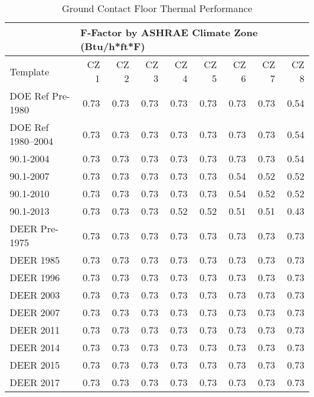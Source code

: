 \begin{table}
\small
\centering
\caption[Ground Contact Floor Thermal Performance]{Ground Contact Floor Thermal Performance}
\label{tab:floor_f_factors}
\begin{tabular}{lrrrrrrrr}
\hline
                  & \multicolumn{8}{l}{F-Factor by ASHRAE Climate Zone (Btu/h*ft*F)} \\ \hline
Template          & CZ 1 & CZ 2 & CZ 3 & CZ 4 & CZ 5 & CZ 6 & CZ 7 & CZ 8 \\ \hline
DOE Ref Pre-1980  & 0.73 & 0.73 & 0.73 & 0.73 & 0.73 & 0.73 & 0.73 & 0.54 \\
DOE Ref 1980--2004 & 0.73 & 0.73 & 0.73 & 0.73 & 0.73 & 0.73 & 0.73 & 0.54 \\
90.1-2004         & 0.73 & 0.73 & 0.73 & 0.73 & 0.73 & 0.73 & 0.73 & 0.54 \\
90.1-2007         & 0.73 & 0.73 & 0.73 & 0.73 & 0.73 & 0.54 & 0.52 & 0.52 \\
90.1-2010         & 0.73 & 0.73 & 0.73 & 0.73 & 0.73 & 0.54 & 0.52 & 0.52 \\
90.1-2013         & 0.73 & 0.73 & 0.73 & 0.52 & 0.52 & 0.51 & 0.51 & 0.43 \\
DEER Pre-1975     & 0.73 & 0.73 & 0.73 & 0.73 & 0.73 & 0.73 & 0.73 & 0.73 \\
DEER 1985         & 0.73 & 0.73 & 0.73 & 0.73 & 0.73 & 0.73 & 0.73 & 0.73 \\
DEER 1996         & 0.73 & 0.73 & 0.73 & 0.73 & 0.73 & 0.73 & 0.73 & 0.73 \\
DEER 2003         & 0.73 & 0.73 & 0.73 & 0.73 & 0.73 & 0.73 & 0.73 & 0.73 \\
DEER 2007         & 0.73 & 0.73 & 0.73 & 0.73 & 0.73 & 0.73 & 0.73 & 0.73 \\
DEER 2011         & 0.73 & 0.73 & 0.73 & 0.73 & 0.73 & 0.73 & 0.73 & 0.73 \\
DEER 2014         & 0.73 & 0.73 & 0.73 & 0.73 & 0.73 & 0.73 & 0.73 & 0.73 \\
DEER 2015         & 0.73 & 0.73 & 0.73 & 0.73 & 0.73 & 0.73 & 0.73 & 0.73 \\
DEER 2017         & 0.73 & 0.73 & 0.73 & 0.73 & 0.73 & 0.73 & 0.73 & 0.73
\end{tabular}
\end{table}

